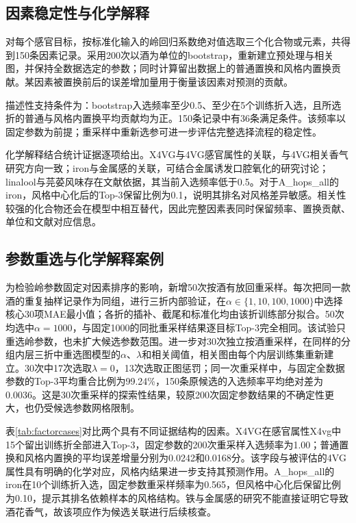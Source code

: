 \documentclass{mathorcup-journal}
\begin{document}
\subsection{因素稳定性与化学解释}

对每个感官目标，按标准化输入的岭回归系数绝对值选取三个化合物或元素，共得到150条因素记录。采用200次以酒为单位的bootstrap，重新建立预处理与相关图，并保持全数据选定的参数；同时计算留出数据上的普通置换和风格内置换贡献。某因素被置换前后的误差增加量用于衡量该因素对预测的贡献。


描述性支持条件为：bootstrap入选频率至少0.5、至少在5个训练折入选，且所选折的普通与风格内置换平均贡献均为正。150条记录中有36条满足条件。该频率以固定参数为前提；重采样中重新选参可进一步评估完整选择流程的稳定性。


化学解释结合统计证据逐项给出。X4VG与4VG感官属性的关联，与4VG相关香气研究方向一致\cite{ref9}；iron与金属感的关联，可结合金属诱发口腔氧化的研究讨论\cite{ref10}；linalool与芫荽风味存在文献依据\cite{ref11}，其当前入选频率低于0.5。对于A\_hops\_all的iron，风格中心化后的Top-3保留比例为0.1，说明其排名对风格差异敏感。相关性较强的化合物还会在模型中相互替代，因此完整因素表同时保留频率、置换贡献、单位和文献对应信息。


\subsection{参数重选与化学解释案例}

为检验岭参数固定对因素排序的影响，新增50次按酒有放回重采样。每次把同一款酒的重复抽样记录作为同组，进行三折内部验证，在$\alpha\in\{1,10,100,1000\}$中选择核心30项MAE最小值；各折的插补、截尾和标准化均由该折训练部分拟合。50次均选中$\alpha=1000$，与固定1000的同批重采样结果逐目标Top-3完全相同。该试验只重选岭参数，也未扩大候选参数范围。进一步对30次独立按酒重采样，在同样的分组内层三折中重选图模型的$\alpha$、$\lambda$和相关阈值，相关图由每个内层训练集重新建立。30次中17次选取$\lambda=0$，13次选取正图惩罚；同一次重采样中，与固定全数据参数的Top-3平均重合比例为99.24\%，150条原候选的入选频率平均绝对差为0.0036。这是30次重采样的探索性结果，较原200次固定参数结果的不确定性更大，也仍受候选参数网格限制。

表\ref{tab:factorcases}对比两个具有不同证据结构的因素。X4VG在感官属性X4vg中15个留出训练折全部进入Top-3，固定参数的200次重采样入选频率为1.00；普通置换和风格内置换的平均误差增量分别为0.0242和0.0168分。该字段与被评估的4VG属性具有明确的化学对应，风格内结果进一步支持其预测作用\cite{ref9}。A\_hops\_all的iron在10个训练折入选，固定参数重采样频率为0.565，但风格中心化后保留比例为0.10，提示其排名依赖样本的风格结构。铁与金属感的研究\cite{ref10}不能直接证明它导致酒花香气，故该项应作为候选关联进行后续核查。
\end{document}
